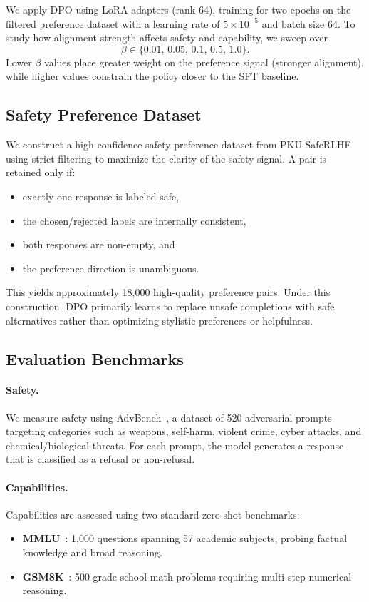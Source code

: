 \documentclass[a4paper, twocolumn, 9pt]{article}
\begin{document}
We apply DPO using LoRA adapters (rank 64), training for two epochs on the filtered
preference dataset with a learning rate of $5\times10^{-5}$ and batch size 64.
To study how alignment strength affects safety and capability, we sweep over
\[
\beta \in \{0.01,\, 0.05,\, 0.1,\, 0.5,\, 1.0\}.
\]
Lower $\beta$ values place greater weight on the preference signal (stronger
alignment), while higher values constrain the policy closer to the SFT baseline.

\subsection{Safety Preference Dataset}

We construct a high-confidence safety preference dataset from
PKU-SafeRLHF~\cite{pku-saferlhf} using strict filtering to maximize the clarity of
the safety signal. A pair is retained only if:

\begin{itemize}
\item exactly one response is labeled safe,
\item the chosen/rejected labels are internally consistent,
\item both responses are non-empty, and
\item the preference direction is unambiguous.
\end{itemize}

This yields approximately 18{,}000 high-quality preference pairs.
Under this construction, DPO primarily learns to replace unsafe completions with
safe alternatives rather than optimizing stylistic preferences or helpfulness.

\subsection{Evaluation Benchmarks}

\paragraph{Safety.}
We measure safety using AdvBench~\cite{advbench}, a dataset of 520 adversarial prompts
targeting categories such as weapons, self-harm, violent crime, cyber attacks, and
chemical/biological threats. For each prompt, the model generates a response that is
classified as a refusal or non-refusal.

\paragraph{Capabilities.}
Capabilities are assessed using two standard zero-shot benchmarks:
\begin{itemize}
\item \textbf{MMLU}~\cite{mmlu}: 1{,}000 questions spanning 57 academic subjects,
      probing factual knowledge and broad reasoning.
\item \textbf{GSM8K}~\cite{gsm8k}: 500 grade-school math problems requiring
      multi-step numerical reasoning.
\end{itemize}
\end{document}
